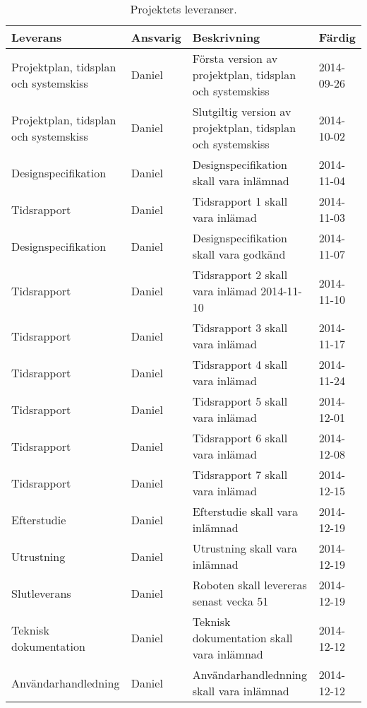 \begin{table}[h]
  \centering
    \begin{tabularx}{\textwidth}{| X | l | X | l |}
      \hline
      \textbf{Leverans} & \textbf{Ansvarig} & \textbf{Beskrivning} & \textbf{Färdig} \\
      \hline

      {Projektplan, tidsplan och systemskiss} & {Daniel} & {Första version av projektplan, tidsplan och systemskiss} & {2014-09-26} \\
            \hline
      {Projektplan, tidsplan och systemskiss} & {Daniel} & {Slutgiltig version av projektplan, tidsplan och systemskiss} & {2014-10-02} \\
      \hline
      {Designspecifikation} & {Daniel} & {Designspecifikation skall vara inlämnad} & {2014-11-04} \\
      \hline
      {Tidsrapport} & {Daniel} & {Tidsrapport 1 skall vara inlämad} & {2014-11-03} \\
      \hline
      {Designspecifikation} & {Daniel} & {Designspecifikation skall vara godkänd} & {2014-11-07} \\
      \hline
      {Tidsrapport} & {Daniel} & {Tidsrapport 2 skall vara inlämad 2014-11-10} & {2014-11-10} \\
      \hline
      {Tidsrapport} & {Daniel} & {Tidsrapport 3 skall vara inlämad} & {2014-11-17} \\
      \hline
      {Tidsrapport} & {Daniel} & {Tidsrapport 4 skall vara inlämad} & {2014-11-24} \\
      \hline
      {Tidsrapport} & {Daniel} & {Tidsrapport 5 skall vara inlämad} & {2014-12-01} \\
      \hline
      {Tidsrapport} & {Daniel} & {Tidsrapport 6 skall vara inlämad} & {2014-12-08} \\
      \hline
      {Tidsrapport} & {Daniel} & {Tidsrapport 7 skall vara inlämad} & {2014-12-15} \\
      \hline
      {Efterstudie} & {Daniel} & {Efterstudie skall vara inlämnad} & {2014-12-19} \\
      \hline
      {Utrustning} & {Daniel} & {Utrustning skall vara inlämnad} & {2014-12-19} \\
      \hline
      {Slutleverans} & {Daniel} & {Roboten skall levereras senast vecka 51} & {2014-12-19} \\
      \hline
      {Teknisk dokumentation} & {Daniel} & {Teknisk dokumentation skall vara inlämnad} & {2014-12-12} \\
      \hline
      {Användarhandledning} & {Daniel} & {Användarhandlednning skall vara inlämnad} & {2014-12-12} \\
      \hline

    \end{tabularx}
  \caption{Projektets leveranser.} \label{dokumentation:tabell}
\end{table}


